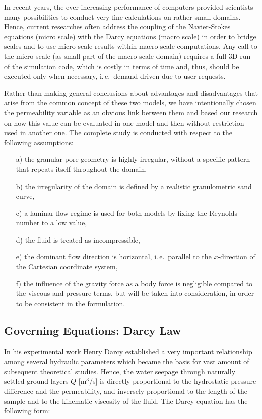 \documentclass[10pt, conference]{IEEEtran}
\begin{document}
In recent years, the ever increasing performance of computers provided scientists many possibilities to conduct very fine calculations on rather small domains. Hence,
current researches often address the coupling of the Navier-Stokes equations (micro scale) with the Darcy equations (macro scale) in order to bridge scales and to use micro scale results within
macro scale computations. Any call to the micro scale (as small part of the macro scale domain) requires a full 3D run of the simulation code, which is costly in terms of time and, thus, should
be executed only when necessary, i.\,e.\ demand-driven due to user requests.

Rather than making general conclusions about advantages and disadvantages that arise from the common concept of these two models, we have intentionally chosen the permeability variable
as an obvious link between them and based our research on how this value can be evaluated in one model and then without restriction used in another one. The complete study is conducted with
respect to the following assumptions: 
\begin{enumerate}
\item[a)] the granular pore geometry is highly irregular, without a specific pattern that repeats itself throughout the domain,
\item[b)] the irregularity of the domain is defined by a realistic granulometric sand curve,
\item[c)] a laminar flow regime is used for both models by fixing the Reynolds number to a low value,
\item[d)] the fluid is treated as incompressible,
\item[e)] the dominant flow direction is horizontal, i.\,e.\ parallel to the $x$-direction of the Cartesian coordinate system,
\item[f)] the influence of the gravity force as a body force is negligible compared to the viscous and pressure terms, but will be taken into consideration, in order to be consistent in the
formulation.
\end{enumerate}


\subsection{Governing Equations: Darcy Law}
\label{sec: equations}
In his experimental work Henry Darcy established a very important relationship among several hydraulic parameters which became the basis for vast amount of
subsequent theoretical studies. Hence, the water seepage through naturally settled ground layers $Q$ [m$^{3}$/s] is directly proportional to the hydrostatic pressure difference and the
permeability, and inversely proportional to the length of the sample and to the kinematic viscosity of the fluid. The Darcy equation has the following form:
\end{document}
